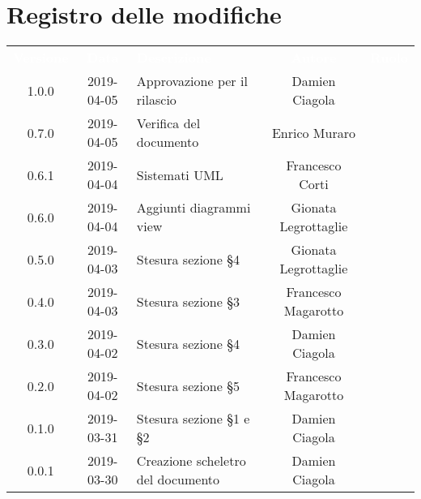 \section*{Registro delle modifiche}
{
	\renewcommand{\arraystretch}{1.5}
	\centering
	\begin{longtable}{ c c C{6cm} c c }
		\textcolor{white}{\textbf{Versione}} & \textcolor{white}{\textbf{Data}} & \textcolor{white}{\textbf{Descrizione}} & \textcolor{white}{\textbf{Autore}} & \textcolor{white}{\textbf{Ruolo}}\\

		1.0.0 & 
		2019-04-05 &  
		Approvazione per il rilascio &	
		Damien Ciagola &
		\RdP{}  \\	
				
		0.7.0 & 
		2019-04-05 &  
		Verifica del documento &	
		Enrico Muraro &
		\ver{}  \\			
		
		0.6.1 & 
		2019-04-04 &  
		Sistemati UML  &	
		Francesco Corti&
		\reda{}  \\			
		
		0.6.0 & 
		2019-04-04 &  
		Aggiunti diagrammi view &	
		Gionata Legrottaglie&
		\reda{}  \\			
		
		0.5.0 & 
		2019-04-03 &  
		Stesura sezione §4 &	
		Gionata Legrottaglie&
		\reda{}  \\			
		
		0.4.0 & 
		2019-04-03 &  
		Stesura sezione §3 &	
		Francesco Magarotto &
		\reda{}  \\			
		
		0.3.0 & 
		2019-04-02 &  
		Stesura sezione §4 &	
		Damien Ciagola &
		\reda{}  \\		
		
		0.2.0 & 
		2019-04-02 &  
		Stesura sezione §5 &	
		Francesco Magarotto &
		\reda{}  \\	
		
		0.1.0 & 
		2019-03-31 &  
		Stesura sezione §1 e §2 &	
		Damien Ciagola &
		\reda{}  \\
		
		0.0.1 & 
		2019-03-30 &  
		Creazione scheletro del documento&	
		Damien Ciagola  &	
		\reda{}  \\
	\end{longtable}

}